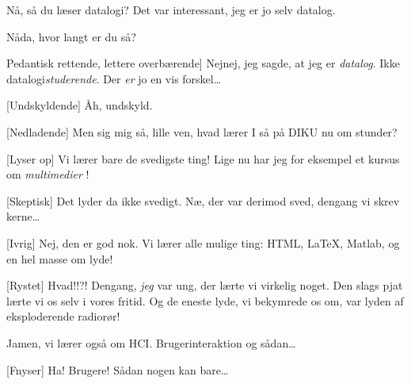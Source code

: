 \documentclass[a4paper,11pt]{article}
\begin{document}
\begin{sketch}
  
  
  

   Nå, så du læser datalogi? Det var interessant, jeg er jo
  selv datalog.
  
   Nåda, hvor langt er du så?
  
   Pedantisk rettende, lettere overbærende] Nejnej, jeg sagde,
  at jeg er \emph{datalog}. Ikke datalogi\emph{studerende}.
   Der \emph{er} jo en vis forskel\ldots
  
  [Undskyldende] Åh, undskyld.
  
  [Nedladende] Men sig mig så, lille ven, hvad lærer I så på
  DIKU nu om stunder?
  
  [Lyser op] Vi lærer bare de svedigste ting! Lige nu har jeg
  for eksempel et kursus om  \emph{multimedier} !
  
  [Skeptisk] Det lyder da ikke svedigt.  Næ, der
  var derimod sved, dengang vi skrev kerne\ldots {}
  
  [Ivrig] Nej, den er god nok. Vi lærer alle mulige ting:
   HTML, \LaTeX , Matlab, og en hel masse om lyde!

  [Rystet] Hvad!!?! Dengang, \emph{jeg} var ung, der lærte vi
  virkelig noget. Den slags pjat lærte vi os selv i vores fritid. Og
  de eneste lyde, vi bekymrede os om, var lyden af eksploderende
  radiorør!
  
   Jamen, vi lærer også om HCI. Brugerinteraktion og
  sådan\ldots
  
  [Fnyser] Ha!  Brugere!  Sådan nogen
  kan bare\ldots {}
  

\end{sketch}
\end{document}
